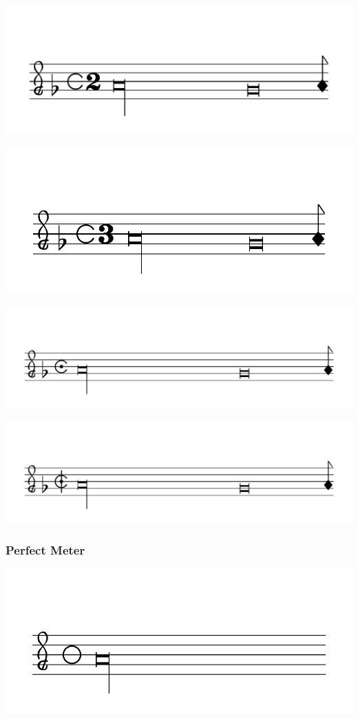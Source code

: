 \documentclass{article}
\begin{document}
        \includegraphics[scale=0.5]{figures_tests/pdf/smens/commonmeter9.pdf}

        \includegraphics[scale=0.5]{figures_tests/pdf/smens/commonmeter10.pdf}

        \includegraphics[scale=0.5]{figures_tests/pdf/smens/commonmeter11.pdf}

        \includegraphics[scale=0.5]{figures_tests/pdf/smens/commonmeter12.pdf}

    \subsubsection*{Perfect Meter}
        \includegraphics[scale=0.5]{figures_tests/pdf/smens/perfectmeter1.pdf}
\end{document}
